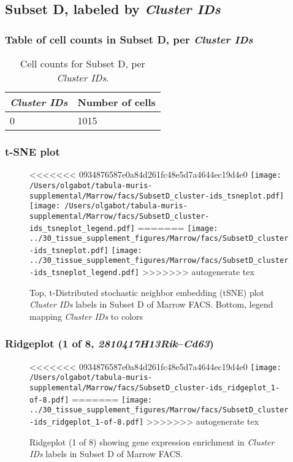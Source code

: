 \clearpage

\subsection{Subset D, labeled by \emph{Cluster IDs}}
\subsubsection{Table of cell counts in Subset D, per \emph{Cluster IDs}}\begin{table}[h]
\centering
\label{my-label}
\begin{tabular}{@{}ll@{}}
\toprule

\emph{Cluster IDs}& Number of cells \\ \midrule
0 & 1015 \\
\bottomrule
\end{tabular}
\caption{Cell counts for Subset D, per \emph{Cluster IDs}.}
\end{table}

\clearpage
\subsubsection{t-SNE plot}
\begin{figure}[h]
\centering
<<<<<<< 0934876587e0a84d261fc48e5d7a4644ec19d4e0
\texttt{[image: /Users/olgabot/tabula-muris-supplemental/Marrow/facs/SubsetD\_cluster-ids\_tsneplot.pdf]}
\texttt{[image: /Users/olgabot/tabula-muris-supplemental/Marrow/facs/SubsetD\_cluster-ids\_tsneplot\_legend.pdf]}
=======
\texttt{[image: ../30\_tissue\_supplement\_figures/Marrow/facs/SubsetD\_cluster-ids\_tsneplot.pdf]}
\texttt{[image: ../30\_tissue\_supplement\_figures/Marrow/facs/SubsetD\_cluster-ids\_tsneplot\_legend.pdf]}
>>>>>>> autogenerate tex
\caption{Top, t-Distributed stochastic neighbor embedding (tSNE) plot  \emph{Cluster IDs} labels in Subset D of Marrow FACS. Bottom, legend mapping \emph{Cluster IDs} to colors}
\end{figure}


\clearpage

\subsubsection{Ridgeplot (1 of 8, \emph{2810417H13Rik}--\emph{Cd63})}
\begin{figure}[h]
\centering
<<<<<<< 0934876587e0a84d261fc48e5d7a4644ec19d4e0
\texttt{[image: /Users/olgabot/tabula-muris-supplemental/Marrow/facs/SubsetD\_cluster-ids\_ridgeplot\_1-of-8.pdf]}
=======
\texttt{[image: ../30\_tissue\_supplement\_figures/Marrow/facs/SubsetD\_cluster-ids\_ridgeplot\_1-of-8.pdf]}
>>>>>>> autogenerate tex

\caption{ Ridgeplot (1 of 8)  showing gene expression enrichment in \emph{Cluster IDs} labels in Subset D of Marrow FACS. }
\end{figure}


